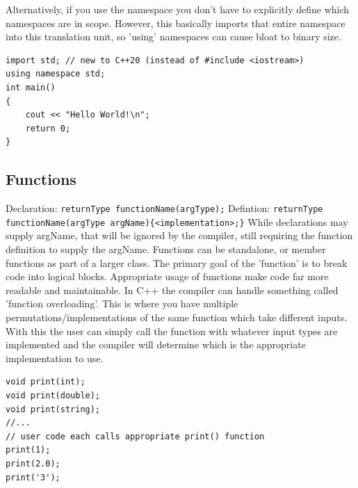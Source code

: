 \documentclass[a4paper, 10pt]{article}
\begin{document}
Alternatively, if you use the namespace you don't have to explicitly define which namespaces are in scope. However, this basically imports that entire namespace into this translation unit, so 'using' namespaces can cause bloat to binary size.
\begin{lstlisting}[style=cpp]
import std; // new to C++20 (instead of #include <iostream>)
using namespace std;
int main()
{
    cout << "Hello World!\n";
    return 0;
}
\end{lstlisting}

\subsection{Functions}
Declaration: \verb!returnType functionName(argType);!\newline
Defintion: \verb!returnType functionName(argType argName){<implementation>;}!
\newline
While declarations may supply argName, that will be ignored by the compiler, still requiring the function definition to supply the argName. Functions can be standalone, or member functions as part of a larger class. The primary goal of the 'function' is to break code into logical blocks. Appropriate usage of functions make code far more readable and maintainable.\newline
In C++ the compiler can handle something called 'function overloading'. This is where you have multiple permutations/implementations of the same function which take different inputs. With this the user can simply call the function with whatever input types are implemented and the compiler will determine which is the appropriate implementation to use.

\begin{lstlisting}[style=cpp]
void print(int);
void print(double);
void print(string);
//...
// user code each calls appropriate print() function
print(1);
print(2.0);
print('3');
\end{lstlisting}
\end{document}
